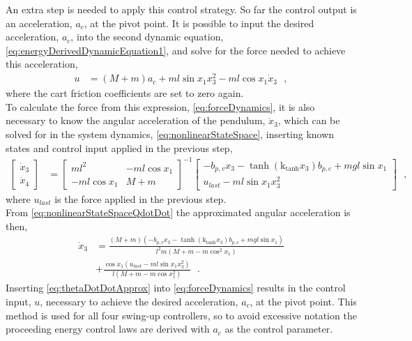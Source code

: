 An extra step is needed to apply this control strategy. So far the control output is an acceleration, $a_c$, at the pivot point. It is possible to input the desired acceleration, $a_c$, into the second dynamic equation, \autoref{eq:energyDerivedDynamicEquation1}, and solve for the force needed to achieve this acceleration,
%
\begin{align}
  u &=  ( M + m )a_c + m l \sin x_1 x_3^2 - m l \cos x_1 \dot{x}_3  \ \ \ ,
  \label{eq:forceDynamics}
\end{align}
%
where the cart friction coefficients are set to zero again.\\
To calculate the force from this expression, \autoref{eq:forceDynamics}, it is also necessary to know the angular acceleration of the pendulum, $\dot{x}_3$, which can be solved for in the system dynamics, \autoref{eq:nonlinearStateSpace}, inserting known states and control input applied in the previous step,
%
\begin{align}
  \begin{bmatrix}
    \dot{x}_3  \\
    \dot{x}_4
  \end{bmatrix}
  &=
  \begin{bmatrix}
    m l^2           & -m l \cos x_1  \\
    -m l \cos x_1   & M + m
  \end{bmatrix}^{-1}
  \begin{bmatrix}
    - b_{p,v} x_3 - \tanh(\text{k}_\text{tanh}x_3) b_{p,c} + m g l \sin x_1 \\
    u_{last} - m l \sin x_1 x_3^2
  \end{bmatrix}
   \ \ \ ,
  \label{eq:nonlinearStateSpaceQdotDot}
\end{align}
%
where $u_{last}$ is the force applied in the previous step.\\
From \autoref{eq:nonlinearStateSpaceQdotDot} the approximated angular acceleration is then,
\begin{align}
  \dot{x}_3 &= \frac{ ( M + m )(- b_{p,v} x_3 - \tanh(\text{k}_\text{tanh}x_3) b_{p,c} + m g l \sin x_1) }{ l^2 m ( M + m - m \cos^2x_1 ) } \nonumber \\
            &+ \frac{ \cos x_1 (u_{last} - m l \sin x_1 x_3^2) }{ l ( M + m - m \cos x_1^2 ) }
  \ \ \ . 
  \label{eq:thetaDotDotApprox}
\end{align}
%
Inserting \autoref{eq:thetaDotDotApprox} into \autoref{eq:forceDynamics} results in the control input, $u$, necessary to achieve the desired acceleration, $a_c$, at the pivot point. This method is used for all four swing-up controllers, so to avoid excessive notation the proceeding energy control laws are derived with $a_c$ as the control parameter.

